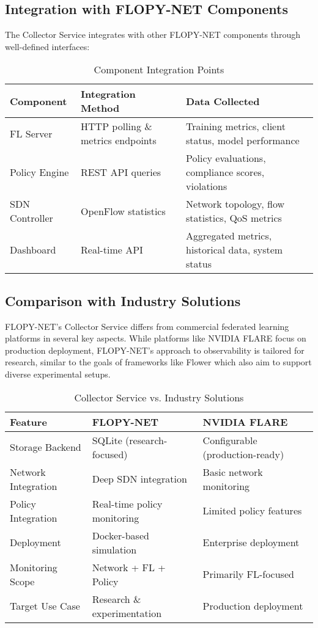 \subsection{Integration with FLOPY-NET Components}

The Collector Service integrates with other FLOPY-NET components through well-defined interfaces:

\begin{table}[H]
\centering
\caption{Component Integration Points}
\label{tab:collector-integration}
\begin{tabular}{@{}llp{5cm}@{}}
\toprule
\textbf{Component} & \textbf{Integration Method} & \textbf{Data Collected} \\
\midrule
FL Server & HTTP polling \& metrics endpoints & Training metrics, client status, model performance \\
Policy Engine & REST API queries & Policy evaluations, compliance scores, violations \\
SDN Controller & OpenFlow statistics & Network topology, flow statistics, QoS metrics \\
Dashboard & Real-time API & Aggregated metrics, historical data, system status \\
\bottomrule
\end{tabular}
\end{table}

\subsection{Comparison with Industry Solutions}

FLOPY-NET's Collector Service differs from commercial federated learning platforms in several key aspects. While platforms like NVIDIA FLARE \cite{nvidia2023flare} focus on production deployment, FLOPY-NET's approach to observability is tailored for research, similar to the goals of frameworks like Flower \cite{beutel2020flower} which also aim to support diverse experimental setups.

\begin{table}[H]
\centering
\caption{Collector Service vs. Industry Solutions}
\label{tab:collector-comparison}
\begin{tabular}{@{}lll@{}}
\toprule
\textbf{Feature} & \textbf{FLOPY-NET} & \textbf{NVIDIA FLARE} \\
\midrule
Storage Backend & SQLite (research-focused) & Configurable (production-ready) \\
Network Integration & Deep SDN integration & Basic network monitoring \\
Policy Integration & Real-time policy monitoring & Limited policy features \\
Deployment & Docker-based simulation & Enterprise deployment \\
Monitoring Scope & Network + FL + Policy & Primarily FL-focused \\
Target Use Case & Research \& experimentation & Production deployment \\
\bottomrule
\end{tabular}
\end{table}

